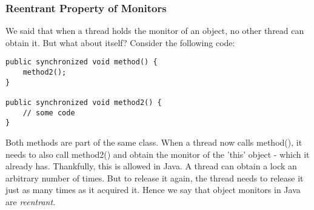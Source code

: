 \documentclass[main.tex]{subfiles}
\begin{document}
\subsubsection{Reentrant Property of Monitors}
We said that when a thread holds the monitor of an object, no other thread can obtain it. But what about itself? Consider the following code:
\begin{verbatim}
public synchronized void method() {
    method2();
}

public synchronized void method2() {
    // some code
}
\end{verbatim}
Both methods are part of the same class. When a thread now calls method(), it needs to also call method2() and obtain the monitor of the 'this' object - which it already has. Thankfully, this is allowed in Java. A thread can obtain a lock an arbitrary number of times. But to release it again, the thread needs to release it just as many times as it acquired it. Hence we say that object monitors in Java are \textit{reentrant}.


\end{document}
